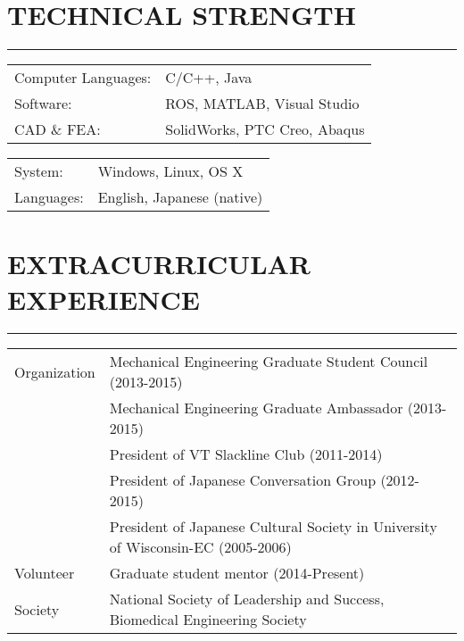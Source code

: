 \documentclass[11pt,letterpaper]{article}
\begin{document}
\section*{TECHNICAL STRENGTH}\vspace{-3mm}
\hrule

\begin{minipage}{0.58\columnwidth}
\begin{tabular}{ll}
Computer Languages:& C/C++, Java\\
Software:& ROS, MATLAB, Visual Studio \\
CAD \& FEA:& SolidWorks, PTC Creo, Abaqus\\
\end{tabular}
\end{minipage}
\begin{minipage}{0.35\columnwidth}
\begin{tabular}{ll}
System: & Windows, Linux, OS X\\
Languages: & English, Japanese (native)\\
\end{tabular}
\end{minipage}

\section*{EXTRACURRICULAR EXPERIENCE}\vspace{-3mm}

\hrule
\begin{minipage}{\columnwidth}
\begin{tabular}{ l  l }
Organization & Mechanical Engineering Graduate Student Council (2013-2015)\\
& Mechanical Engineering Graduate Ambassador (2013-2015)\\ 
& President of VT Slackline Club (2011-2014)\\
& President of Japanese Conversation Group (2012-2015)\\
& President of Japanese Cultural Society in University of Wisconsin-EC (2005-2006)\\
Volunteer & Graduate student mentor (2014-Present)\\
Society & National Society of Leadership and Success, Biomedical Engineering Society
\end{tabular}
\end{minipage}
\end{document}
